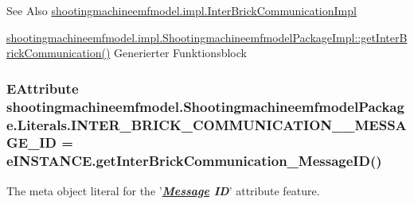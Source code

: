 \begin{DoxySeeAlso}{See Also}
\hyperlink{classshootingmachineemfmodel_1_1impl_1_1_inter_brick_communication_impl}{shootingmachineemfmodel.\-impl.\-Inter\-Brick\-Communication\-Impl} 

\hyperlink{classshootingmachineemfmodel_1_1impl_1_1_shootingmachineemfmodel_package_impl_a6dcf03b9cd465e27248a0278c6e55f11}{shootingmachineemfmodel.\-impl.\-Shootingmachineemfmodel\-Package\-Impl\-::get\-Inter\-Brick\-Communication()} Generierter Funktionsblock 
\end{DoxySeeAlso}
\hypertarget{interfaceshootingmachineemfmodel_1_1_shootingmachineemfmodel_package_1_1_literals_a7f8c5b876efa409144b3f78f77678e1a}{
\subsubsection[{I\-N\-T\-E\-R\-\_\-\-B\-R\-I\-C\-K\-\_\-\-C\-O\-M\-M\-U\-N\-I\-C\-A\-T\-I\-O\-N\-\_\-\-\_\-\-M\-E\-S\-S\-A\-G\-E\-\_\-\-I\-D}]{\setlength{\rightskip}{0pt plus 5cm}E\-Attribute shootingmachineemfmodel.\-Shootingmachineemfmodel\-Package.\-Literals.\-I\-N\-T\-E\-R\-\_\-\-B\-R\-I\-C\-K\-\_\-\-C\-O\-M\-M\-U\-N\-I\-C\-A\-T\-I\-O\-N\-\_\-\-\_\-\-M\-E\-S\-S\-A\-G\-E\-\_\-\-I\-D = e\-I\-N\-S\-T\-A\-N\-C\-E.\-get\-Inter\-Brick\-Communication\-\_\-\-Message\-I\-D()}}\label{interfaceshootingmachineemfmodel_1_1_shootingmachineemfmodel_package_1_1_literals_a7f8c5b876efa409144b3f78f77678e1a}
The meta object literal for the '{\itshape {\bfseries \hyperlink{interfaceshootingmachineemfmodel_1_1_message}{Message} I\-D}}' attribute feature.

